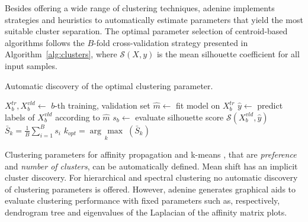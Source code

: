 \documentclass[twoside,11pt]{article}
\makeatletter
\newcommand{\argmax}[1]{\underset{#1}{\operatorname{arg}\,\operatorname{max}}\;}
\newcommand{\ade}{{\sc adenine}\@\xspace}
\makeatother
\begin{document}
  Besides offering a wide range of clustering techniques,
  \ade implements strategies and heuristics to automatically estimate parameters that yield the most suitable cluster separation.
  The optimal parameter selection of centroid-based algorithms follows the $B$-fold cross-validation strategy presented in Algorithm~\ref{alg:clusters}, where $\mathcal{S}(X,y)$ is the mean silhouette coefficient \citep{rousseeuw1987silhouettes} for all input samples.


  \begin{algorithm}[]
    \small
  \caption{Automatic discovery of the optimal clustering parameter.}\label{alg:clusters}
  \label{alg:clusters}
  \begin{algorithmic}[1]
                  \State $X^{tr}_b,X^{vld}_b\leftarrow$ $b$-th training, validation set
                  \State $\hat{m}\leftarrow$ fit model on $X^{tr}_b$
                  \State $\hat{y}\leftarrow$ predict labels of $X^{vld}_b$ according to $\hat{m}$
                  \State $s_b\leftarrow$ evaluate silhouette score  $\mathcal{S}(X^{vld}_b,\hat{y})$
  	\EndFor
  	\State $\bar{S}_k = \frac{1}{B}\sum_{i=1}^B s_i$
  \EndFor
  \State $k_{opt} = \argmax{k}(\bar{S}_k)$
  \end{algorithmic}
  \end{algorithm}

  Clustering parameters for affinity propagation \citep{frey2007clustering} and k-means \citep{bishop2006pattern}, that are \emph{preference} and \emph{number of clusters}, can be automatically defined. Mean shift \citep{comaniciu2002mean} has an implicit cluster discovery.
  For hierarchical \citep{friedman2001elements} and spectral clustering \citep{shi2000normalized} no automatic discovery of clustering parameters is offered. However, \ade generates graphical aids to evaluate clustering performance with fixed parameters such as, respectively, dendrogram tree and eigenvalues of the Laplacian of the affinity matrix plots.
\end{document}

